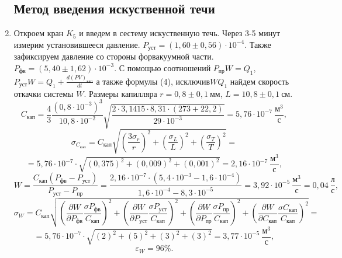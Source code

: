 \documentclass[a4paper]{article}
\begin{document}
\begin{enumerate}
\subsection{Метод введения искуственной течи}
\item Откроем кран $K_5$ и введем в сестему искуственную течь. Через 3-5 минут измерим установившееся давление. $P_{\text{уст}} = (1,60 \pm 0,56) \cdot 10^{-4}$. Также зафиксируем давление со стороны форвакуумной части.\\ $P_{\text{фв}} = (5,40 \pm 1,62) \cdot 10^{-3}$. С помощью соотношений $P_{\text{пр}} W = Q_1$, $P_{\text{уст}} W = Q_1 + \frac{d(PV)_{\text{кап}}}{dt}$ а также формулы (4), исключив$WQ_1$ найдем скорость откачки системы $W$. Размеры капилляра $r = 0,8 \pm 0,1 \ \text{мм}$, $L = 10,8 \pm 0,1 \ \text{см}$.
\begin{equation*}
      C_\text{кап} = \frac{4}{3} \frac{(0,8\cdot 10^{-3})^3}{10,8 \cdot 10^{-2}} \sqrt{\frac{2 \cdot 3,1415 \cdot 8,31 \cdot (273 + 22,2)}{29 \cdot 10^{-3}}} = 5,76 \cdot 10^{-7} \ \frac{\text{м}^3}{\text{с}},
\end{equation*}
\begin{equation*}
      \sigma_{C_\text{кап}} = C_\text{кап} \sqrt{\left(\frac{3\sigma_r}{r}\right)^2 + \left(\frac{\sigma_L}{L}\right)^2 + \left(\frac{\sigma_T}{T}\right)^2} =
\end{equation*}
\begin{equation*}
= 5,76 \cdot 10^{-7} \cdot \sqrt{\left(0,375\right)^2 + \left(0,009\right)^2 + \left(0,001\right)^2} = 2,16 \cdot 10^{-7} \ \frac{\text{м}^3}{\text{с}},
\end{equation*}
\begin{equation*}
      W = \frac{C_\text{кап}(P_{\text{фв}} - P_{\text{уст}})}{P_{\text{уст}} - P_{\text{пр}}} = \frac{2,16 \cdot 10^{-7} \cdot (5,4 \cdot 10^{-3} - 1,6 \cdot 10^{-4} )}{1,6 \cdot 10^{-4} - 8,3 \cdot 10^{-5}} = 3,92 \cdot 10^{-5} \ \frac{\text{м}^3}{\text{с}} = 0,04 \ \frac{\text{л}}{\text{с}},
\end{equation*}
\begin{equation*}
      \sigma_W = C_\text{кап} \sqrt{\left(\frac{\partial W}{\partial P_{\text{фв}}}\frac{\sigma{P_{\text{фв}}}}{C_\text{кап}}\right)^2 + \left(\frac{\partial W}{\partial P_{\text{уст}}}\frac{\sigma{P_{\text{уст}}}}{C_\text{кап}}\right)^2 + \left(\frac{\partial W}{\partial P_{\text{пр}}}\frac{\sigma{P_{\text{пр}}}}{C_\text{кап}}\right)^2 + \left(\frac{\partial W}{\partial C_\text{кап}}\frac{\sigma{C_\text{кап}}}{C_\text{кап}}\right)^2} =
\end{equation*}
\begin{equation*}
= 5,76 \cdot 10^{-7} \cdot \sqrt{\left(2\right)^2 + \left(5\right)^2 + \left(3\right)^2 + \left(3\right)^2} = 3,77 \cdot 10^{-5} \ \frac{\text{м}^3}{\text{с}},
\end{equation*}
\begin{equation*}
      \varepsilon_W = 96 \%.
\end{equation*}


\end{enumerate}
\end{document}

